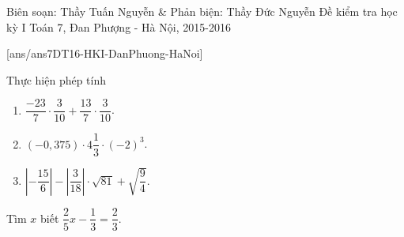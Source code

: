 	\begin{name}
		{Biên soạn: Thầy Tuấn Nguyễn \& Phản biện: Thầy Đức Nguyễn}
		{Đề kiểm tra học kỳ I Toán 7, Đan Phượng - Hà Nội, 2015-2016}
	\end{name}
	\setcounter{ex}{0}
	[ans/ans7DT16-HKI-DanPhuong-HaNoi]

\begin{ex}%
Thực hiện phép tính
\begin{enumerate}
	\item $\dfrac{-23}{7}\cdot \dfrac{3}{10}+\dfrac{13}{7}\cdot \dfrac{3}{10}$.
	\item $(-0,375)\cdot 4\dfrac{1}{3}\cdot (-2)^3$.
	\item $\left|-\dfrac{15}{6} \right| -\left|\dfrac{3}{18} \right|\cdot \sqrt{81}+\sqrt{\dfrac{9}{4}}$.
\end{enumerate}
\end{ex}

\begin{ex}%
Tìm $x$ biết
 $\dfrac{2}{5}x-\dfrac{1}{3}=\dfrac{2}{3}$.
\end{ex}


